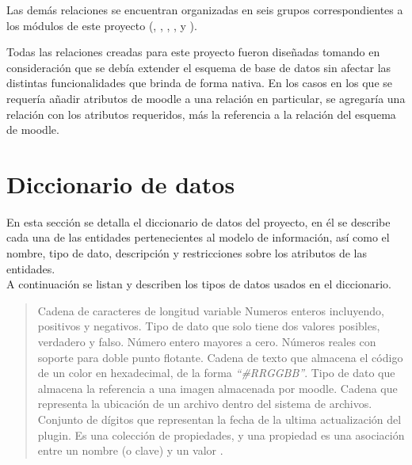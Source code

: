  \noindent Las demás relaciones se encuentran organizadas en seis grupos correspondientes
 a los módulos de este proyecto (, , ,
 ,  y ).

 \clearpage

 \noindent Todas las relaciones creadas para este proyecto fueron diseñadas tomando en
 consideración que se debía extender el esquema de base de datos sin afectar las distintas
 funcionalidades que brinda de forma nativa. En los casos en los que se requería añadir
 atributos de moodle a una relación en particular, se agregaría una relación con los atributos
 requeridos, más la referencia a la relación del esquema de moodle.


\clearpage
\section{Diccionario de datos}

 En esta sección se detalla el diccionario de datos del proyecto, en él se describe cada una
 de las entidades pertenecientes al modelo de información, así como el nombre, tipo de dato,
 descripción y restricciones sobre los atributos de las entidades.\\

 A continuación se listan y describen los tipos de
 datos usados en el diccionario.

    \begin{quote}
    \begin{bGlosario}
         Cadena de caracteres de longitud variable
                 Numeros enteros incluyendo, positivos y negativos.
         Tipo de dato que solo tiene dos valores posibles,
                                  verdadero y falso.
         Número entero mayores a cero.
           Números reales con soporte para doble punto flotante.
             Cadena de texto que almacena el código de un color en hexadecimal,
                                  de la forma {\it ``\#RRGGBB''}.
            Tipo de dato que almacena la referencia a una imagen almacenada por
                                  moodle.
               Cadena que representa la ubicación de un archivo dentro del sistema
                                  de archivos.
         Conjunto de dígitos que representan la fecha de la ultima
                                  actualización del plugin.
          Es una colección de propiedades, y una propiedad es una
                                  asociación entre un nombre (o clave) y un valor
                                  \cite{ObjectMozilla}.
    \end{bGlosario}
    \end{quote}


